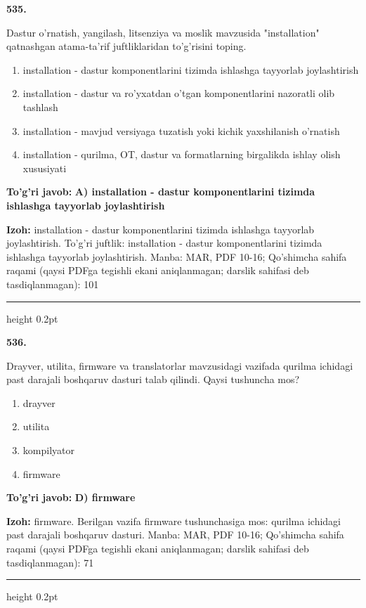 \documentclass[10pt,a4paper]{article}
\begin{document}
{\bfseries\sffamily\color{ink} 535.}
\par
Dastur o'rnatish, yangilash, litsenziya va moslik mavzusida "installation" qatnashgan atama-ta'rif juftliklaridan to'g'risini toping.
\begin{enumerate}[label=\Alph*),leftmargin=9mm]
\item installation - dastur komponentlarini tizimda ishlashga tayyorlab joylashtirish
\item installation - dastur va ro'yxatdan o'tgan komponentlarini nazoratli olib tashlash
\item installation - mavjud versiyaga tuzatish yoki kichik yaxshilanish o'rnatish
\item installation - qurilma, OT, dastur va formatlarning birgalikda ishlay olish xususiyati
\end{enumerate}
\begin{tcolorbox}[enhanced,breakable,colback=teal!4,colframe=teal!60!black,boxrule=0.45pt,arc=1.2mm,left=2.7mm,right=2.7mm,top=1.8mm,bottom=1.8mm,before skip=2mm,after skip=2mm]
{\bfseries\sffamily\color{teal}To'g'ri javob:} \textbf{A) installation - dastur komponentlarini tizimda ishlashga tayyorlab joylashtirish}
\par\smallskip
{\bfseries Izoh:} installation - dastur komponentlarini tizimda ishlashga tayyorlab joylashtirish. To'g'ri juftlik: installation - dastur komponentlarini tizimda ishlashga tayyorlab joylashtirish. Manba: MAR, PDF 10-16; Qo'shimcha sahifa raqami (qaysi PDFga tegishli ekani aniqlanmagan; darslik sahifasi deb tasdiqlanmagan): 101
\end{tcolorbox}
\vspace{2mm}\hrule height 0.2pt\vspace{3mm}

{\bfseries\sffamily\color{ink} 536.}
\par
Drayver, utilita, firmware va translatorlar mavzusidagi vazifada qurilma ichidagi past darajali boshqaruv dasturi talab qilindi. Qaysi tushuncha mos?
\begin{enumerate}[label=\Alph*),leftmargin=9mm]
\item drayver
\item utilita
\item kompilyator
\item firmware
\end{enumerate}
\begin{tcolorbox}[enhanced,breakable,colback=teal!4,colframe=teal!60!black,boxrule=0.45pt,arc=1.2mm,left=2.7mm,right=2.7mm,top=1.8mm,bottom=1.8mm,before skip=2mm,after skip=2mm]
{\bfseries\sffamily\color{teal}To'g'ri javob:} \textbf{D) firmware}
\par\smallskip
{\bfseries Izoh:} firmware. Berilgan vazifa firmware tushunchasiga mos: qurilma ichidagi past darajali boshqaruv dasturi. Manba: MAR, PDF 10-16; Qo'shimcha sahifa raqami (qaysi PDFga tegishli ekani aniqlanmagan; darslik sahifasi deb tasdiqlanmagan): 71
\end{tcolorbox}
\vspace{2mm}\hrule height 0.2pt\vspace{3mm}
\end{document}
